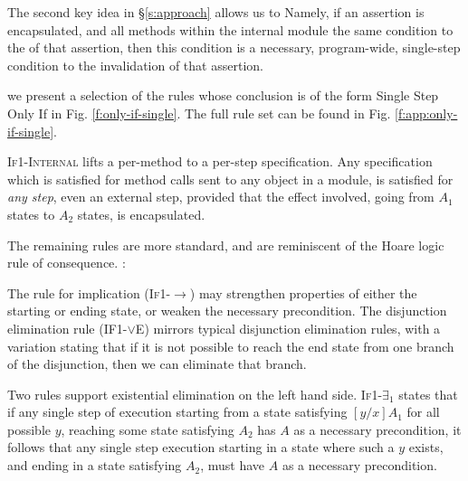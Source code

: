 {The second key idea in \S \ref{s:approach}} allows us to
Namely, if an assertion is encapsulated, and all methods within the internal module
 the same condition to the  of that assertion, then 
this condition is a necessary, program-wide, single-step condition   to the invalidation of that assertion.

 we present a selection of the rules whose conclusion is of the form Single Step Only If in Fig. \ref{f:only-if-single}.
 The full rule set can be found in Fig. \ref{f:app:only-if-single}.

\textsc{If1-Internal} 
 lifts a  per-method \Nec {} to a per-step \Nec specification.
Any \Nec specification which is satisfied for  method
calls sent to any object in a module, is satisfied for \emph{any step}, even
an external step, provided that the effect involved, \ie going from $A_1$ states to
$A_2$ states, is encapsulated.

 The remaining rules are more standard, and are reminiscent of the Hoare logic rule of consequence.
:
 
The  rule for implication (\textsc{If1-$\longrightarrow$}) may strengthen
 properties of either the starting or ending state, or 
weaken the necessary precondition. 
%
%
The disjunction
elimination rule (\textsc{IF1-$\vee$E}) mirrors typical disjunction elimination
rules, with a variation stating that if it is not possible  to reach 
the end state from one branch of the disjunction, then we can eliminate 
that branch. 

Two rules support existential elimination on the left hand side. %
\textsc{If1-$\exists_1$} states that if any single step of execution starting
from a state satisfying $[y/x]A_1$ for all possible $y$, reaching some state satisfying
$A_2$ has $A$ as a necessary precondition, it follows that any single step execution
starting in a state where such a $y$ exists, and ending in a state satisfying $A_2$,
must have $A$ as a necessary precondition.  



